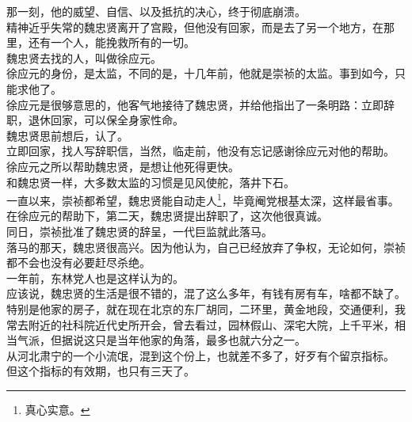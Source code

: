 \begin{multicols}{\theparacolNo}
那一刻，他的威望、自信、以及抵抗的决心，终于彻底崩溃。\\

精神近乎失常的魏忠贤离开了宫殿，但他没有回家，而是去了另一个地方，在那里，还有一个人，能挽救所有的一切。\\

魏忠贤去找的人，叫做徐应元。\\

徐应元的身份，是太监，不同的是，十几年前，他就是崇祯的太监。事到如今，只能求他了。\\

徐应元是很够意思的，他客气地接待了魏忠贤，并给他指出了一条明路：立即辞职，退休回家，可以保全身家性命。\\

魏忠贤思前想后，认了。\\

立即回家，找人写辞职信，当然，临走前，他没有忘记感谢徐应元对他的帮助。\\

徐应元之所以帮助魏忠贤，是想让他死得更快。\\

和魏忠贤一样，大多数太监的习惯是见风使舵，落井下石。\\

一直以来，崇祯都希望，魏忠贤能自动走人\footnote{真心实意。}，毕竟阉党根基太深，这样最省事。\\

在徐应元的帮助下，第二天，魏忠贤提出辞职了，这次他很真诚。\\

同日，崇祯批准了魏忠贤的辞呈，一代巨监就此落马。\\

落马的那天，魏忠贤很高兴。因为他认为，自己已经放弃了争权，无论如何，崇祯都不会也没有必要赶尽杀绝。\\

一年前，东林党人也是这样认为的。\\

应该说，魏忠贤的生活是很不错的，混了这么多年，有钱有房有车，啥都不缺了。特别是他家的房子，就在现在北京的东厂胡同，二环里，黄金地段，交通便利，我常去附近的社科院近代史所开会，曾去看过，园林假山、深宅大院，上千平米，相当气派，但据说这只是当年他家的角落，最多也就六分之一。\\

从河北肃宁的一个小流氓，混到这个份上，也就差不多了，好歹有个留京指标。\\

但这个指标的有效期，也只有三天了。\\


\end{multicols}
